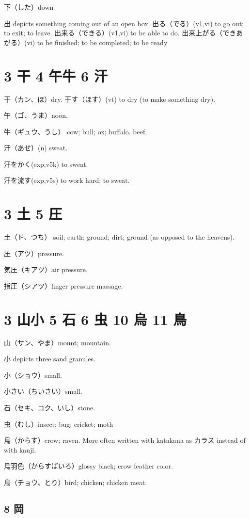 下（した）down

出 depicts something coming out of an open box.
出る（でる）(v1,vi) to go out; to exit; to leave.
出来る（できる）(v1,vi) to be able to do.
出来上がる（できあがる）(vi) to be finished; to be completed; to be ready

\section{3 干 4 午牛 6 汗}

干（カン、ほ）dry.
干す（ほす）(vt) to dry (to make something dry).

午（ゴ、うま）noon.

牛（ギュウ、うし）
cow; bull; ox; buffalo.
beef.

汗（あせ）(n) sweat.

汗をかく(exp,v5k) to sweat.

汗を流す(exp,v5s) to work hard; to sweat.

\section{3 土 5 圧}

土（ド、つち）
soil; earth; ground; dirt; ground (as opposed to the heavens).

圧（アツ）pressure.

気圧（キアツ）air pressure.

指圧（シアツ）finger pressure massage.

\section{3 山小 5 石 6 虫 10 烏 11 鳥}

山（サン、やま）mount; mountain.

小 depicts three sand granules.

小（ショウ）small.

小さい（ちいさい）small.

石（セキ、コク、いし）stone.

虫（むし）insect; bug; cricket; moth

烏（からす）crow; raven.
More often written with katakana as カラス instead of with kanji.

烏羽色（からすばいろ）glossy black; crow feather color.

鳥（チョウ、とり）bird; chicken; chicken meat.

\subsection{8 岡}

